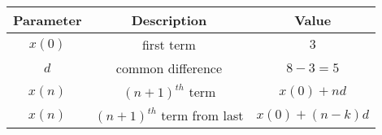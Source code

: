 \begin{tabular}{|c|c|c|}
        \hline
        \textbf{Parameter} & \textbf{Description} & \textbf{Value} \\
        \hline
        $x(0)$ & first term  & $3$ \\
         \hline
        $d$ & common difference & $8 - 3 = 5$ \\
        \hline
        $x(n)$ & $(n+1)^{th}$ term&$x(0) + nd$\\
        \hline
        $x(n)$&$(n+1)^{th}$ term from last & $x(0)+(n-k)d$\\
        \hline
    \end{tabular}
